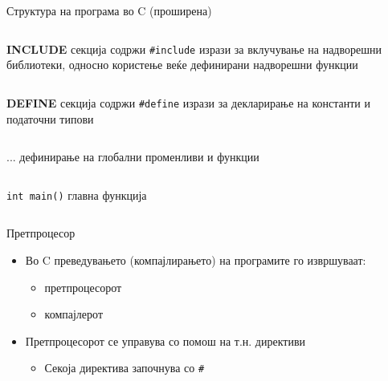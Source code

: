 \begin{frame}{Структура на програма во C (проширена)}
	\begin{columns}
		\textbf{INCLUDE} секција
		 содржи \texttt{\#include} изрази за вклучување на надворешни библиотеки, односно користење веќе дефинирани надворешни функции
	\end{columns}
	\hfill
	\linebreak
	\begin{columns}
		\column{.2\textwidth}
		\textbf{DEFINE} секција
		 содржи \texttt{\#define} изрази за декларирање на константи и податочни типови
	\end{columns}	
	\hfill
	\linebreak
	\begin{columns}
		...
		 дефинирање на глобални променливи и функции
	\end{columns}
	\hfill
	\linebreak
	\begin{columns}
		\column{.2\textwidth}
		\texttt{int main()}
		 главна функција
	\end{columns}
\end{frame}

\begin{frame}{Претпроцесор}
\begin{itemize}
	\item Во C преведувањето (компајлирањето) на програмите го извршуваат:
	\begin{itemize}
		\item претпроцесорот
		\item компајлерот
	\end{itemize}
	\item Претпроцесорот се управува со помош на т.н. директиви
	\begin{itemize}
		\item Секоја директива започнува со \texttt{\#}
	\end{itemize}
\end{itemize}
\end{frame}

